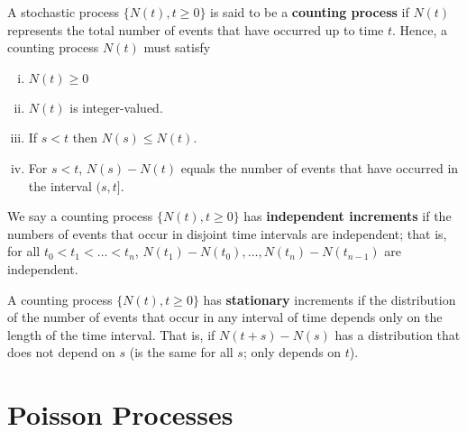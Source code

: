 \begin{definition}A stochastic process \(\{N(t), t \geq 0\}\) is said to be a \textbf{counting process} if \(N(t)\) represents the total number of events that have occurred up to time \(t\). Hence, a counting process \(N(t)\) must satisfy

\begin{enumerate}[(i)]

\item \(N(t) \geq 0\)

\item \(N(t)\) is integer-valued.

\item If \(s <t\) then \(N(s) \leq N(t)\).

\item For \(s < t\), \(N(s) -N(t)\) equals the number of events that have occurred in the interval \((s, t]\).

\end{enumerate}

\end{definition}

\begin{definition} We say a counting process \(\{N(t), t\geq0\}\) has \textbf{independent increments} if the numbers of events that occur in disjoint time intervals are independent; that is, for all \(t_0 < t_1 < \ldots < t_n\), \(  N(t_1) - N(t_0), \ldots, N(t_n) - N(t_{n-1})\) are independent. 

\end{definition}

\begin{definition}\label{stoch.stationary.increments.def} A counting process \(\{N(t) , t \geq 0 \}\) has \textbf{stationary} increments if the distribution of the number of events that occur in any interval of time depends only on the length of the time interval. That is, if \(N(t+s) - N(s)\) has a distribution that does not depend on \(s\) (is the same for all \(s\); only depends on \(t\)).

\end{definition}

\section{Poisson Processes}\label{stoch.pois.proc.sec}

